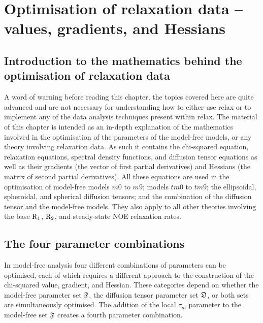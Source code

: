 
\chapter{Optimisation of relaxation data -- values, gradients, and Hessians} \label{ch: values, gradients, and Hessians}




\section{Introduction to the mathematics behind the optimisation of relaxation data}


A word of warning before reading this chapter, the topics covered here are quite advanced and are not necessary for understanding how to either use relax or to implement any of the data analysis techniques present within relax.  The material of this chapter is intended as an in-depth explanation of the mathematics involved in the optimisation of the parameters of the model-free models, or any theory involving relaxation data.  As such it contains the chi-squared equation, relaxation equations, spectral density functions, and diffusion tensor equations as well as their gradients (the vector of first partial derivatives) and Hessians (the matrix of second partial derivatives).  All these equations are used in the optimisation of model-free models $m0$ to $m9$; models $tm0$ to $tm9$; the ellipsoidal, spheroidal, and spherical diffusion tensors; and the combination of the diffusion tensor and the model-free models.  They also apply to all other theories involving the base $\mathrm{R}_1$, $\mathrm{R}_2$, and steady-state NOE relaxation rates.




\section{The four parameter combinations}

In model-free analysis four different combinations of parameters can be optimised, each of which requires a different approach to the construction of the chi-squared value, gradient, and Hessian.  These categories depend on whether the model-free parameter set $\mathfrak{F}$, the diffusion tensor parameter set $\mathfrak{D}$, or both sets are simultaneously optimised.  The addition of the local $\tau_m$ parameter to the model-free set $\mathfrak{F}$ creates a fourth parameter combination.




